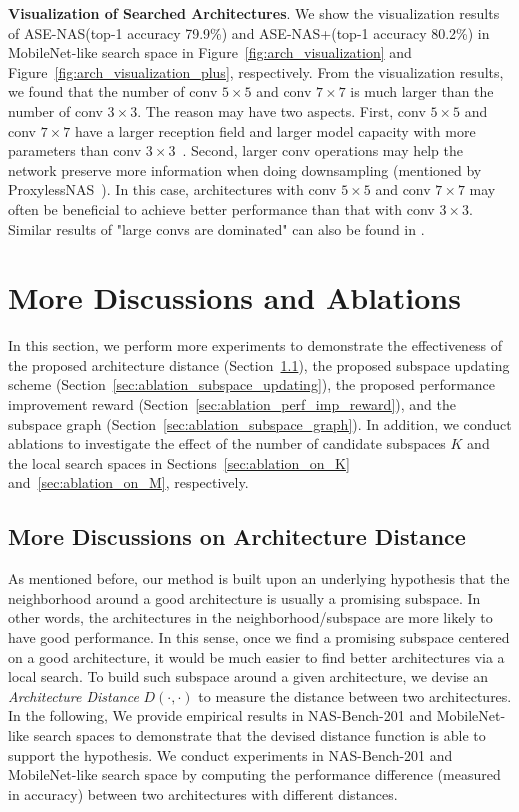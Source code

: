 \documentclass[lettersize,journal]{IEEEtran}
\newcommand{\sexyname}{ASE-NAS\xspace}
\newcommand{\sexynameplus}{ASE-NAS+\xspace}
\begin{document}
\textbf{Visualization of Searched Architectures}.
We show the visualization results of \sexyname (top-1 accuracy 79.9\%) and \sexynameplus (top-1 accuracy 80.2\%) in MobileNet-like search space in Figure~\ref{fig:arch_visualization} and Figure~\ref{fig:arch_visualization_plus}, respectively.
From the visualization results, we found that
the number of conv $5\times5$ and conv $7\times7$ is much larger than the number of conv $3\times3$.
The reason may have two aspects. 
First, conv $5\times5$ and conv $7\times7$ have a larger reception field and larger model capacity with more parameters than conv $3\times3$~\cite{tan2019mixconv}. Second, larger conv operations may help the network preserve more information when doing downsampling (mentioned by ProxylessNAS~\cite{cai2018proxylessnas}).
In this case, architectures with conv $5\times5$ and conv $7\times7$ may often be beneficial to achieve better performance than that with conv $3\times3$.
Similar results of "large convs are dominated" can also be found in \cite{Cai2020Once,cai2018proxylessnas}.



\section{More Discussions and Ablations}

In this section, we perform more experiments to  demonstrate the effectiveness of the proposed architecture distance (Section~\ref{sec:ablation_arch_distance}), the proposed subspace updating scheme (Section~\ref{sec:ablation_subspace_updating}), the proposed performance improvement reward (Section~\ref{sec:ablation_perf_imp_reward}), and the subspace graph (Section~\ref{sec:ablation_subspace_graph}).
In addition, we conduct ablations to investigate the effect of the number of candidate subspaces $K$ and the local search spaces in Sections~\ref{sec:ablation_on_K} and~\ref{sec:ablation_on_M}, respectively.

\subsection{More Discussions on Architecture Distance}\label{sec:ablation_arch_distance}

As mentioned before, our method is built upon an underlying hypothesis that the neighborhood around a good architecture is usually a promising subspace.
In other words, the architectures in the neighborhood/subspace are more likely to have good performance.
In this sense, once we find a promising subspace centered on a good architecture, it would be much easier to find better architectures via a local search.
To build such subspace around a given architecture, we devise an \textit{Architecture Distance} $D(\cdot, \cdot)$ to measure the distance between two architectures.
In the following, We provide empirical results in  NAS-Bench-201 and MobileNet-like search spaces to demonstrate that the devised distance function is able to support the hypothesis.
We conduct experiments in NAS-Bench-201 and MobileNet-like search space by computing the performance difference (measured in accuracy) between two architectures with different distances.
\end{document}
